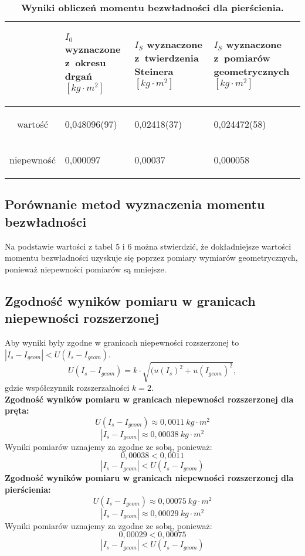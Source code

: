 \documentclass[a4paper,11pt]{article}
\begin{document}
\begin{table}[ht]
\centering
\caption{\textbf{Wyniki obliczeń momentu bezwładności dla pierścienia.}}
\begin{tabular}{|c|m{30mm}|m{30mm}|m{30mm}|}
\hline
& \begin{center}
\textbf{$I_{0}$ wyznaczone z~okresu drgań $[kg\cdot m^{2}]$}
\end{center} & \begin{center}
\textbf{$I_{S}$ wyznaczone z~twierdzenia Steinera $[kg\cdot m^{2}]$}
\end{center} & \begin{center}
\textbf{$I_{S}$ wyznaczone z~pomiarów geometrycznych $[kg\cdot m^{2}]$}
\end{center}  \\ \hline
wartość & \begin{center}0,048096(97)\end{center} & \begin{center}0,02418(37)\end{center} & \begin{center}0,024472(58)\end{center}\\ \hline
niepewność &\begin{center}0,000097\end{center} & \begin{center}0,00037\end{center} & \begin{center}0,000058\end{center}\\ \hline
\end{tabular}
\end{table}

\subsection{Porównanie metod wyznaczenia momentu bezwładności}
Na podstawie wartości z tabel 5 i 6 można stwierdzić, że dokładniejsze wartości momentu bezwładności uzyskuje się poprzez pomiary wymiarów geometrycznych, ponieważ niepewności pomiarów są mniejsze.

\subsection{Zgodność wyników pomiaru w granicach niepewności rozszerzonej}
Aby wyniki były zgodne w granicach niepewności rozszerzonej to $|I_{s} - I_{geom}|<U(I_{s} - I_{geom})$.
$$U(I_{s} - I_{geom}) = k \cdot \sqrt{(u(I_{s})^2 + u(I_{geom})^2},$$
gdzie współczynnik rozszerzalności $k = 2$.
$$$$
\textbf{Zgodność wyników pomiaru w granicach niepewności rozszerzonej dla pręta:}
$$U(I_{s} - I_{geom}) \approx 0,0011~kg \cdot m^2$$
$$|I_{s} - I_{geom}| \approx 0,00038~kg \cdot m^2$$
Wyniki pomiarów uznajemy za zgodne ze sobą, ponieważ: 
$$0,00038 < 0,0011$$
$$|I_{s} - I_{geom}| < U(I_{s} - I_{geom})$$
\textbf{Zgodność wyników pomiaru w granicach niepewności rozszerzonej dla pierścienia:}
$$U(I_{s} - I_{geom}) \approx 0,00075~kg \cdot m^2$$
$$|I_{s} - I_{geom}| \approx 0,00029~kg \cdot m^2$$
Wyniki pomiarów uznajemy za zgodne ze sobą, ponieważ: 
$$ 0,00029<0,00075 $$
$$|I_{s} - I_{geom}| < U(I_{s} - I_{geom})$$
\end{document}
